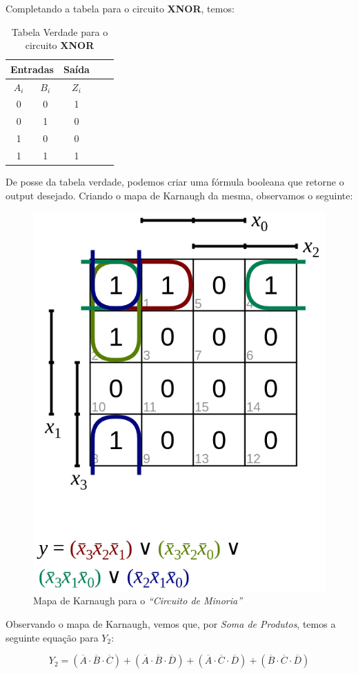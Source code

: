 \documentclass[12pt]{article}
\begin{document}
Completando a tabela para o circuito \textbf{XNOR}, temos:

\begin{table}[H]
    \centering
    \caption{Tabela Verdade para o circuito \textbf{XNOR}}
    \begin{tabular}{|c|c|c|c|c|}\hline
    \multicolumn{2}{|c|}{Entradas} & \multicolumn{1}{|c|}{Saída} \\\hline
    \textbf{$A_{i}$} & \textbf{$B_{i}$} & \textbf{$Z_{i}$} \\\hline
    0 & 0 & 1 \\\hline
    0 & 1 & 0 \\\hline
    1 & 0 & 0 \\\hline
    1 & 1 & 1 \\\hline
    \end{tabular}\label{tab:comparador_de_palavras_3_bits}
\end{table}

De posse da tabela verdade, podemos criar uma fórmula booleana que retorne o
output desejado. Criando o mapa de Karnaugh da mesma, observamos o seguinte:

\begin{figure}[H]
    \centering
    \includegraphics[width=.5\textwidth]{Exp03/2_2_karnaugh_map.png}
    \caption{Mapa de Karnaugh para o \textit{``Circuito de Minoria''}}\label{fig:2_2_karnaugh_map.png}
\end{figure}

Observando o mapa de Karnaugh, vemos que, por \textit{Soma de Produtos}, temos a
seguinte equação para \(Y_{2}\):

\begin{equation}
  Y_{2} = (\overline{A} \cdot \overline{B} \cdot \overline{C}) + (\overline{A} \cdot \overline{B} \cdot \overline{D}) + (\overline{A} \cdot \overline{C} \cdot \overline{D}) + (\overline{B} \cdot \overline{C} \cdot \overline{D})
\end{equation}
\end{document}
